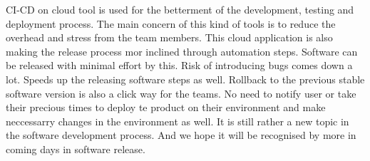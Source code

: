 CI-CD on cloud tool is used for the betterment of the development, testing and deployment process. The main concern of this kind of tools is to reduce the overhead and stress from the team members. This cloud application is also making the release process mor inclined through automation steps. Software can be released with minimal effort by this. Risk of introducing bugs comes down a lot. Speeds up the releasing software steps as well. Rollback to the previous stable software version is also a click way for the teams. No need to notify user or take their precious times to deploy te product on their environment and make neccessarry changes in the environment as well. It is still rather a new topic in the software development process. And we hope it will be recognised by more in coming days in software release.
